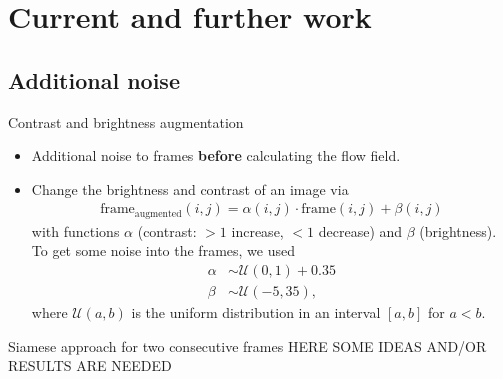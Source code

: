 \section{Current and further work}
\subsection{Additional noise}
\begin{frame}{Contrast and brightness augmentation}
\begin{itemize}
\item Additional noise to frames \textbf{before} calculating the flow field.
\item Change the brightness and contrast of an image via
\begin{align*}
\text{frame}_{\mathrm{augmented}}(i,j) = \alpha(i,j) \cdot \text{frame}(i,j) + \beta(i,j)
\end{align*}
with functions $\alpha$ (contrast: $>1$ increase, $<1$ decrease) and $\beta$ (brightness).\\
To get some noise into the frames, we used
\begin{align*}
\alpha &\sim \mathcal{U}(0,1)+0.35\\
\beta &\sim \mathcal{U}(-5,35),
\end{align*}
where $\mathcal{U}(a,b)$ is the uniform distribution in an interval $[a,b]$ for $a < b$.
\end{itemize}
\end{frame}

\begin{frame}{Siamese approach for two consecutive frames}
HERE SOME IDEAS AND/OR RESULTS ARE NEEDED
\end{frame}
